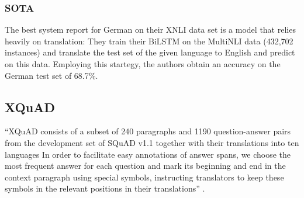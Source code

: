 \subsubsection{SOTA}

The best system \cite{conneau2018xnli} report for German on their XNLI data set is a model that
relies heavily on translation:
They train their BiLSTM on the MultiNLI data (432,702 instances) and translate the test set of the
given language to English and predict on this data.
Employing this startegy, the authors obtain an accuracy on the German test set of 68.7\%.



\subsection{XQuAD}

``XQuAD consists of a subset of 240 paragraphs and 1190 question-answer pairs from the development
set of SQuAD v1.1 together with their translations into ten languages \textelp{} In order to
facilitate easy annotations of answer spans, we choose the most frequent answer for each question
and mark its beginning and end in the context paragraph using special symbols, instructing
translators to keep these symbols in the relevant positions in their translations''
\cite{artetxe2019cross}.

